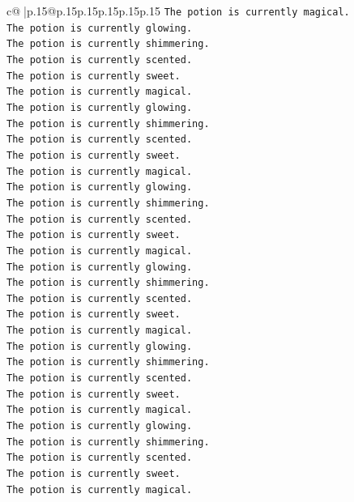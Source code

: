 \documentclass{article}
\begin{document}
{\begin{supertabular}{c@{$\;$}|p{.15\linewidth}@{}p{.15\linewidth}p{.15\linewidth}p{.15\linewidth}p{.15\linewidth}p{.15\linewidth}}
{{{\texttt{The potion is currently magical.} \\
\texttt{The potion is currently glowing.} \\
\texttt{The potion is currently shimmering.} \\
\texttt{The potion is currently scented.} \\
\texttt{The potion is currently sweet.} \\
\texttt{The potion is currently magical.} \\
\texttt{The potion is currently glowing.} \\
\texttt{The potion is currently shimmering.} \\
\texttt{The potion is currently scented.} \\
\texttt{The potion is currently sweet.} \\
\texttt{The potion is currently magical.} \\
\texttt{The potion is currently glowing.} \\
\texttt{The potion is currently shimmering.} \\
\texttt{The potion is currently scented.} \\
\texttt{The potion is currently sweet.} \\
\texttt{The potion is currently magical.} \\
\texttt{The potion is currently glowing.} \\
\texttt{The potion is currently shimmering.} \\
\texttt{The potion is currently scented.} \\
\texttt{The potion is currently sweet.} \\
\texttt{The potion is currently magical.} \\
\texttt{The potion is currently glowing.} \\
\texttt{The potion is currently shimmering.} \\
\texttt{The potion is currently scented.} \\
\texttt{The potion is currently sweet.} \\
\texttt{The potion is currently magical.} \\
\texttt{The potion is currently glowing.} \\
\texttt{The potion is currently shimmering.} \\
\texttt{The potion is currently scented.} \\
\texttt{The potion is currently sweet.} \\
\texttt{The potion is currently magical.} \\
}}}
\end{supertabular}}
\end{document}
